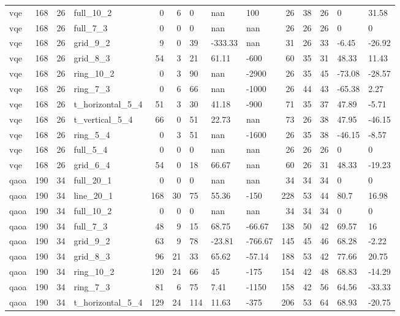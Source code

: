 \begin{longtable}{lrrlrrlllrrlll}
vqe & 168 & 26 & full\_10\_2 & 0 & 6 & 0 & nan & 100 & 26 & 38 & 26 & 0 & 31.58 \\
vqe & 168 & 26 & full\_7\_3 & 0 & 0 & 0 & nan & nan & 26 & 26 & 26 & 0 & 0 \\
vqe & 168 & 26 & grid\_9\_2 & 9 & 0 & 39 & -333.33 & nan & 31 & 26 & 33 & -6.45 & -26.92 \\
vqe & 168 & 26 & grid\_8\_3 & 54 & 3 & 21 & 61.11 & -600 & 60 & 35 & 31 & 48.33 & 11.43 \\
vqe & 168 & 26 & ring\_10\_2 & 0 & 3 & 90 & nan & -2900 & 26 & 35 & 45 & -73.08 & -28.57 \\
vqe & 168 & 26 & ring\_7\_3 & 0 & 6 & 66 & nan & -1000 & 26 & 44 & 43 & -65.38 & 2.27 \\
vqe & 168 & 26 & t\_horizontal\_5\_4 & 51 & 3 & 30 & 41.18 & -900 & 71 & 35 & 37 & 47.89 & -5.71 \\
vqe & 168 & 26 & t\_vertical\_5\_4 & 66 & 0 & 51 & 22.73 & nan & 73 & 26 & 38 & 47.95 & -46.15 \\
vqe & 168 & 26 & ring\_5\_4 & 0 & 3 & 51 & nan & -1600 & 26 & 35 & 38 & -46.15 & -8.57 \\
vqe & 168 & 26 & full\_5\_4 & 0 & 0 & 0 & nan & nan & 26 & 26 & 26 & 0 & 0 \\
vqe & 168 & 26 & grid\_6\_4 & 54 & 0 & 18 & 66.67 & nan & 60 & 26 & 31 & 48.33 & -19.23 \\
qaoa & 190 & 34 & full\_20\_1 & 0 & 0 & 0 & nan & nan & 34 & 34 & 34 & 0 & 0 \\
qaoa & 190 & 34 & line\_20\_1 & 168 & 30 & 75 & 55.36 & -150 & 228 & 53 & 44 & 80.7 & 16.98 \\
qaoa & 190 & 34 & full\_10\_2 & 0 & 0 & 0 & nan & nan & 34 & 34 & 34 & 0 & 0 \\
qaoa & 190 & 34 & full\_7\_3 & 48 & 9 & 15 & 68.75 & -66.67 & 138 & 50 & 42 & 69.57 & 16 \\
qaoa & 190 & 34 & grid\_9\_2 & 63 & 9 & 78 & -23.81 & -766.67 & 145 & 45 & 46 & 68.28 & -2.22 \\
qaoa & 190 & 34 & grid\_8\_3 & 96 & 21 & 33 & 65.62 & -57.14 & 188 & 53 & 42 & 77.66 & 20.75 \\
qaoa & 190 & 34 & ring\_10\_2 & 120 & 24 & 66 & 45 & -175 & 154 & 42 & 48 & 68.83 & -14.29 \\
qaoa & 190 & 34 & ring\_7\_3 & 81 & 6 & 75 & 7.41 & -1150 & 158 & 42 & 56 & 64.56 & -33.33 \\
qaoa & 190 & 34 & t\_horizontal\_5\_4 & 129 & 24 & 114 & 11.63 & -375 & 206 & 53 & 64 & 68.93 & -20.75 \\

\end{longtable}
